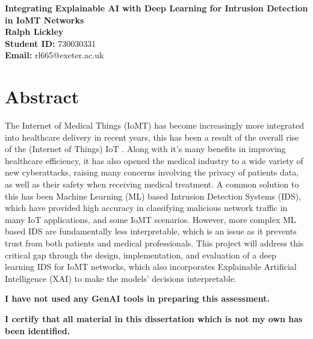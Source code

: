 \documentclass[11pt,a4paper]{article}
\begin{document}
\singlespacing  %
\thispagestyle{empty} %

\begin{center}
{\bf \LARGE Integrating Explainable AI with Deep Learning for Intrusion Detection in IoMT Networks}\\[0.5cm]
    \textbf{Ralph Lickley} \\[0.2cm]
    \textbf{Student ID:} 730030331 \\[1cm]
    \textbf{Email:} rl665@exeter.ac.uk \\[1cm]
\end{center}

\section*{Abstract}
\noindent 
The Internet of Medical Things (IoMT) has become increasingly more integrated into healthcare delivery in recent years, this has been a result of the overall rise of the (Internet of Things) IoT \cite{statistaiot}. Along with it’s many benefits in improving healthcare efficiency, it has also opened the medical industry to a wide variety of new cyberattacks, raising many concerns involving the privacy of patients data, as well as their safety when receiving medical treatment. A common solution to this has been Machine Learning (ML) based Intrusion Detection Systems (IDS), which have provided high accuracy in classifying malicious network traffic in many IoT applications, and some IoMT scenarios. However, more complex ML based IDS are fundamentally less interpretable, which is an issue as it prevents trust from both patients and medical professionals. This project will address this critical gap through the design, implementation, and evaluation of a deep learning IDS for IoMT networks, which also incorporates Explainable Artificial Intelligence (XAI) to make the models’ decisions interpretable.
\vspace*{\fill}


\begin{checkbox_t}
    \item {\bf I have not used any GenAI tools in preparing this assessment.}
    \item {\bf I certify that all material in this dissertation which is not my own has been identified.}
\end{checkbox_t}
\end{document}

